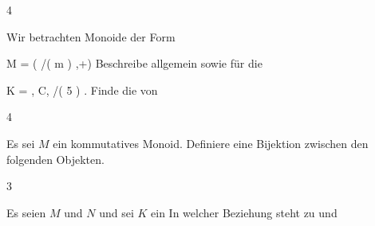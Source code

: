 {4}
{





Wir betrachten Monoide der Form

\mavergleichskettedisp
{\vergleichskette
{ M
}
{ =} { ( \Z/( m ) ,+)
}
{ } {
}
{ } {
}
{ } {
}
}
{}{}{}
Beschreibe
 allgemein sowie für die

\mavergleichskette
{\vergleichskette
{ K
}
{ = }{ \R, {\mathbb C}, \Z/( 5 )
}
{  }{
}
{    }{
}
{   }{
}
}
{}{}{.}
Finde die
von





}
{} {}

{4}
{





Es sei $M$ ein kommutatives Monoid. Definiere eine Bijektion zwischen den folgenden Objekten.





}
{} {}

{3}
{





Es seien $M$ und $N$
und sei $K$ ein
In welcher Beziehung steht
 zu
 und





}
{} {}

